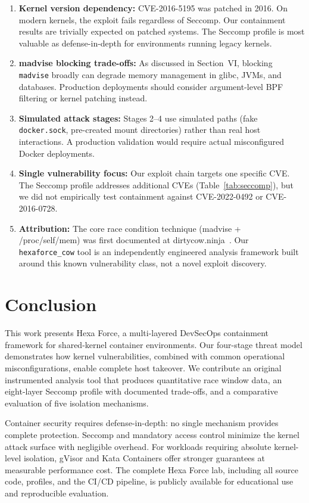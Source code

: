 \documentclass[conference]{IEEEtran}
\begin{document}
\begin{enumerate}
    \item \textbf{Kernel version dependency:} CVE-2016-5195 was patched in 2016. On modern kernels, the exploit fails regardless of Seccomp. Our containment results are trivially expected on patched systems. The Seccomp profile is most valuable as defense-in-depth for environments running legacy kernels.
    \item \textbf{madvise blocking trade-offs:} As discussed in Section~VI, blocking \texttt{madvise} broadly can degrade memory management in glibc, JVMs, and databases. Production deployments should consider argument-level BPF filtering or kernel patching instead.
    \item \textbf{Simulated attack stages:} Stages 2--4 use simulated paths (fake \texttt{docker.sock}, pre-created mount directories) rather than real host interactions. A production validation would require actual misconfigured Docker deployments.
    \item \textbf{Single vulnerability focus:} Our exploit chain targets one specific CVE. The Seccomp profile addresses additional CVEs (Table~\ref{tab:seccomp}), but we did not empirically test containment against CVE-2022-0492 or CVE-2016-0728.
    \item \textbf{Attribution:} The core race condition technique (madvise + /proc/self/mem) was first documented at dirtycow.ninja~\cite{b1}. Our \texttt{hexaforce\_cow} tool is an independently engineered analysis framework built around this known vulnerability class, not a novel exploit discovery.
\end{enumerate}

\section{Conclusion}
This work presents Hexa Force, a multi-layered DevSecOps containment framework for shared-kernel container environments. Our four-stage threat model demonstrates how kernel vulnerabilities, combined with common operational misconfigurations, enable complete host takeover. We contribute an original instrumented analysis tool that produces quantitative race window data, an eight-layer Seccomp profile with documented trade-offs, and a comparative evaluation of five isolation mechanisms.

Container security requires defense-in-depth: no single mechanism provides complete protection. Seccomp and mandatory access control minimize the kernel attack surface with negligible overhead. For workloads requiring absolute kernel-level isolation, gVisor and Kata Containers offer stronger guarantees at measurable performance cost. The complete Hexa Force lab, including all source code, profiles, and the CI/CD pipeline, is publicly available for educational use and reproducible evaluation.
\end{document}
